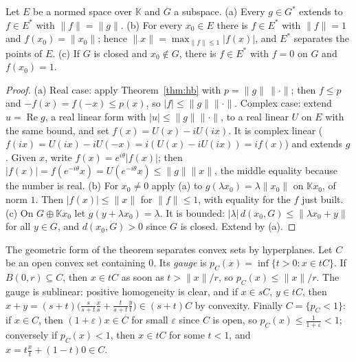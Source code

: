 \begin{corollary}\label{cor:hbnorm}
Let $E$ be a normed space over $\mathbb K$ and $G$ a subspace. (a) Every $g\in G^*$ extends to $f\in E^*$ with $\|f\|=\|g\|$. (b) For every $x_0\in E$ there is $f\in E^*$ with $\|f\|=1$ and $f(x_0)=\|x_0\|$; hence
$\|x\|=\max_{\|f\|\le1}|f(x)|$, and $E^*$ separates the points of $E$. (c) If $G$ is closed and $x_0\notin G$, there is $f\in E^*$ with $f=0$ on $G$ and $f(x_0)=1$.
\end{corollary}
\begin{proof}
(a) Real case: apply Theorem~\ref{thm:hb} with $p=\|g\|\,\|\cdot\|$; then $f\le p$ and $-f(x)=f(-x)\le p(x)$, so $|f|\le\|g\|\|\cdot\|$. Complex case: extend $u=\operatorname{Re}g$, a real linear form with $|u|\le\|g\|\|\cdot\|$, to a real
linear $U$ on $E$ with the same bound, and set $f(x)=U(x)-iU(ix)$. It is complex linear ($f(ix)=U(ix)-iU(-x)=i(U(x)-iU(ix))=if(x)$) and extends $g$. Given $x$, write $f(x)=e^{i\theta}|f(x)|$; then
$|f(x)|=f(e^{-i\theta}x)=U(e^{-i\theta}x)\le\|g\|\|x\|$, the middle equality because the number is real. (b) For $x_0\ne0$ apply (a) to $g(\lambda x_0)=\lambda\|x_0\|$ on $\mathbb Kx_0$, of norm $1$. Then
$|f(x)|\le\|x\|$ for $\|f\|\le1$, with equality for the $f$ just built. (c) On $G\oplus\mathbb Kx_0$ let $g(y+\lambda x_0)=\lambda$. It is bounded: $|\lambda|\,d(x_0,G)\le\|\lambda x_0+y\|$ for all $y\in G$, and
$d(x_0,G)>0$ since $G$ is closed. Extend by (a).
\end{proof}

The geometric form of the theorem separates convex sets by hyperplanes. Let $C$ be an open convex set containing $0$. Its \emph{gauge} is $p_C(x)=\inf\{t>0:x\in tC\}$. If $B(0,r)\subseteq C$, then $x\in tC$ as soon as
$t>\|x\|/r$, so $p_C(x)\le\|x\|/r$. The gauge is sublinear: positive homogeneity is clear, and if $x\in sC$, $y\in tC$, then $x+y=(s+t)\bigl(\frac s{s+t}\frac xs+\frac t{s+t}\frac yt\bigr)\in(s+t)C$ by convexity. Finally
$C=\{p_C<1\}$: if $x\in C$, then $(1+\varepsilon)x\in C$ for small $\varepsilon$ since $C$ is open, so $p_C(x)\le\frac1{1+\varepsilon}<1$; conversely if $p_C(x)<1$, then $x\in tC$ for some $t<1$, and
$x=t\frac xt+(1-t)0\in C$.


